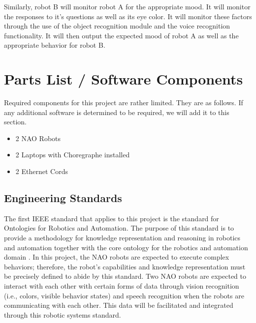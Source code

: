 Similarly, robot B will monitor robot A for the appropriate mood. It will monitor the responses to it’s questions as well as its eye color. It will monitor these factors through the use of the object recognition module and the voice recognition functionality. It will then output the expected mood of robot A as well as the appropriate behavior for robot B. \par 



\section{Parts List /  Software Components}
Required components for this project are rather limited. They are as follows. If any additional software is determined to be required, we will add it to this section. \par 
\begin{itemize}
    \item 2 NAO Robots
    \item 2 Laptops with Choregraphe installed
    \item 2 Ethernet Cords

\end{itemize}

\subsection{Engineering Standards}

The first IEEE standard that applies to this project is the standard for Ontologies for Robotics and Automation. The purpose of this standard is to provide a methodology for knowledge representation and reasoning in robotics and automation together with the core ontology for the robotics and automation domain \cite{7084073}. In this project, the NAO robots are expected to execute complex behaviors; therefore, the robot’s capabilities and knowledge representation must be precisely defined to abide by this standard. Two NAO robots are expected to interact with each other with certain forms of data through vision recognition (i.e., colors, visible behavior states) and speech recognition when the robots are communicating with each other. This data will be facilitated and integrated through this robotic systems standard.\par

